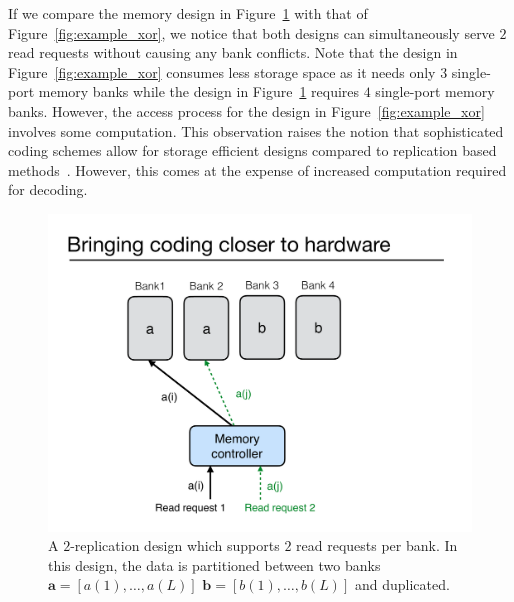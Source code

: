 \begin{remark}
\label{rem:read_only}
If we compare the memory design in Figure~\ref{fig:read_replication} with that of Figure~\ref{fig:example_xor}, we notice that both designs can simultaneously serve $2$ read requests without causing any bank conflicts. Note that the design in Figure~\ref{fig:example_xor} consumes less storage space as it needs only $3$ single-port memory banks while the design in  Figure~\ref{fig:read_replication} requires $4$ single-port memory banks. However, the access process for the design in Figure~\ref{fig:example_xor} involves some computation. {\color{red}This observation raises the notion that sophisticated coding schemes allow for storage efficient designs compared to replication based methods~\cite{MacSlo}. However, this comes at the expense of increased computation required for decoding.}
\end{remark}

\begin{figure}[t!]
\centering
\includegraphics[width=0.425\linewidth]{fig/read-replication.pdf}
\caption{A $2$-replication design which supports $2$ read requests per bank. In this design, the data is partitioned between two banks $\mathbf{a} = [a(1),\ldots, a(L)]$ $\mathbf{b} = [b(1),\ldots, b(L)]$ and duplicated.}
\label{fig:read_replication}
\end{figure}

